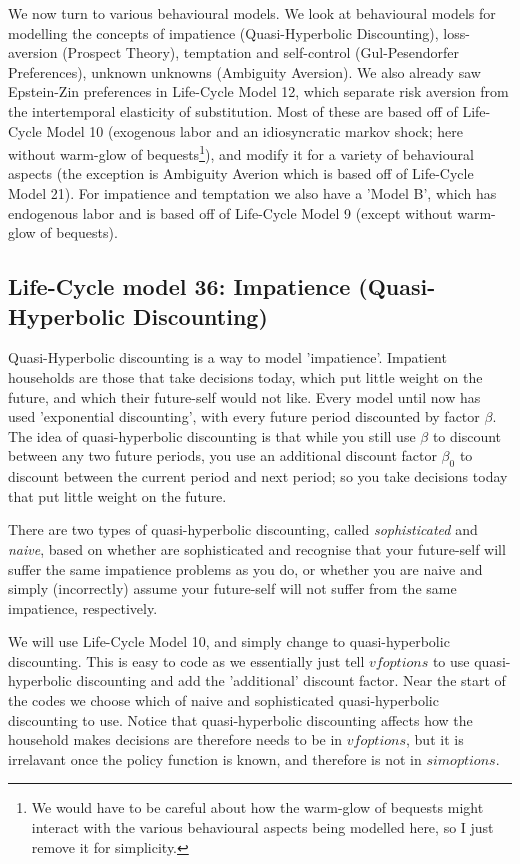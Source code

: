 We now turn to various behavioural models. We look at behavioural models for modelling the concepts of impatience (Quasi-Hyperbolic Discounting), loss-aversion (Prospect Theory), temptation and self-control (Gul-Pesendorfer Preferences), unknown unknowns (Ambiguity Aversion). We also already saw Epstein-Zin preferences in Life-Cycle Model 12, which separate risk aversion from the intertemporal elasticity of substitution.
Most of these are based off of Life-Cycle Model 10 (exogenous labor and an idiosyncratic markov shock; here without warm-glow of bequests\footnote{We would have to be careful about how the warm-glow of bequests might interact with the various behavioural aspects being modelled here, so I just remove it for simplicity.}), and modify it for a variety of behavioural aspects (the exception is Ambiguity Averion which is based off of Life-Cycle Model 21).
For impatience and temptation we also have a 'Model B', which has endogenous labor and is based off of Life-Cycle Model 9 (except without warm-glow of bequests).

\subsection{Life-Cycle model 36: Impatience (Quasi-Hyperbolic Discounting)}
Quasi-Hyperbolic discounting is a way to model 'impatience'. Impatient households are those that take decisions today, which put little weight on the future, and which their future-self would not like. Every model until now has used 'exponential discounting', with every future period discounted by factor $\beta$. The idea of quasi-hyperbolic discounting is that while you still use $\beta$ to discount between any two future periods, you use an additional discount factor $\beta_0$ to discount between the current period and next period; so you take decisions today that put little weight on the future.

There are two types of quasi-hyperbolic discounting, called \textit{sophisticated} and \textit{naive}, based on whether are sophisticated and recognise that your future-self will suffer the same impatience problems as you do, or whether you are naive and simply (incorrectly) assume your future-self will not suffer from the same impatience, respectively.

We will use Life-Cycle Model 10, and simply change to quasi-hyperbolic discounting. This is easy to code as we essentially just tell $vfoptions$ to use quasi-hyperbolic discounting and add the 'additional' discount factor. Near the start of the codes we choose which of naive and sophisticated quasi-hyperbolic discounting to use. Notice that quasi-hyperbolic discounting affects how the household makes decisions are therefore needs to be in $vfoptions$, but it is irrelavant once the policy function is known, and therefore is not in $simoptions$.

